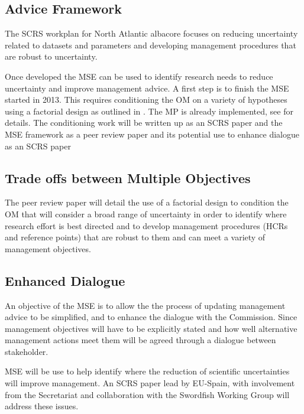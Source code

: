 \documentclass[a4paper,10pt]{article}
\begin{document}
\subsection{Advice Framework}

The SCRS workplan for North Atlantic albacore focuses on reducing uncertainty related to datasets and parameters and 
developing management procedures that are robust to uncertainty. 

Once developed the MSE can be used to identify research needs to reduce uncertainty and improve management advice.
A first step is to finish the MSE started in 2013. This requires conditioning the OM on a variety of hypotheses using a factorial design as outlined in 
. The MP is already implemented, see  for details.
The conditioning work will be written up as an SCRS paper  and the MSE framework as a peer 
review paper   and its potential use to enhance dialogue as an SCRS paper 

\subsection{Trade offs between Multiple Objectives}

The peer review paper  will detail the use of a factorial design to condition the OM that will consider a broad range of 
uncertainty in order to identify where research effort is best directed and to develop
management procedures (HCRs and reference points) that are robust to them and can meet a variety of management objectives.
 
\subsection{Enhanced Dialogue}

An objective of the MSE is to allow the the process of updating management advice to be simplified, 
and to enhance the dialogue with the Commission. Since management objectives will have to be explicitly stated
and how well alternative management actions meet them will be agreed through a dialogue between stakeholder. 

MSE will be use to help identify where the reduction of scientific uncertainties will improve management.
An SCRS paper lead by EU-Spain, with involvement from
the Secretariat and collaboration with the Swordfish Working Group
will address these issues.
\end{document}
